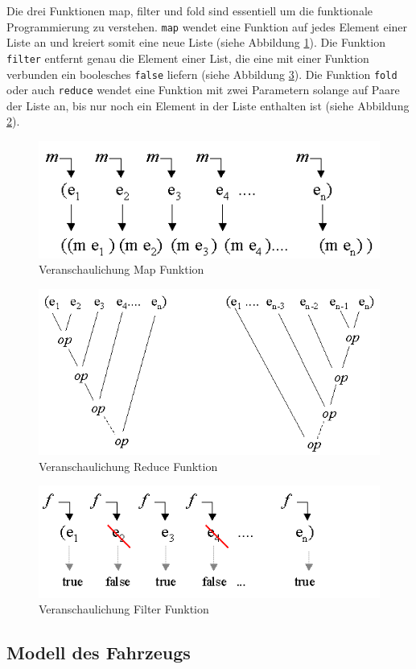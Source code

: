\documentclass[12pt,a4paper,bibliography=totocnumbered,listof=totocnumbered, abstracton]{scrartcl}
\def\code#1{\texttt{#1}}
\theoremstyle{Umgebung}
\begin{document}
Die drei Funktionen map, filter und fold sind essentiell um die funktionale Programmierung zu verstehen. \code{map} wendet eine Funktion auf jedes Element einer Liste an und kreiert somit eine neue Liste (siehe Abbildung \ref{fig:map}). Die Funktion \code{filter} entfernt genau die Element einer List, die eine mit einer Funktion verbunden ein boolesches \code{false} liefern (siehe Abbildung \ref{fig:filter}). Die Funktion \code{fold} oder auch \code{reduce} wendet eine Funktion mit zwei Parametern solange auf Paare der Liste an, bis nur noch ein Element in der Liste enthalten ist (siehe Abbildung \ref{fig:reduce}).

\begin{figure}
	\centering
	\includegraphics[width=0.6\linewidth]{img/practical/map}
	\caption{Veranschaulichung Map Funktion}
	\label{fig:map}
\end{figure}

\begin{figure}
	\centering
	\includegraphics[width=0.6\linewidth]{img/practical/reduction}
	\caption{Veranschaulichung Reduce Funktion}
	\label{fig:reduce}
\end{figure}

\begin{figure}
	\centering
	\includegraphics[width=0.6\linewidth]{img/practical/filter}
	\caption{Veranschaulichung Filter Funktion}
	\label{fig:filter}
\end{figure}

\subsection{Modell des Fahrzeugs}
\end{document}
